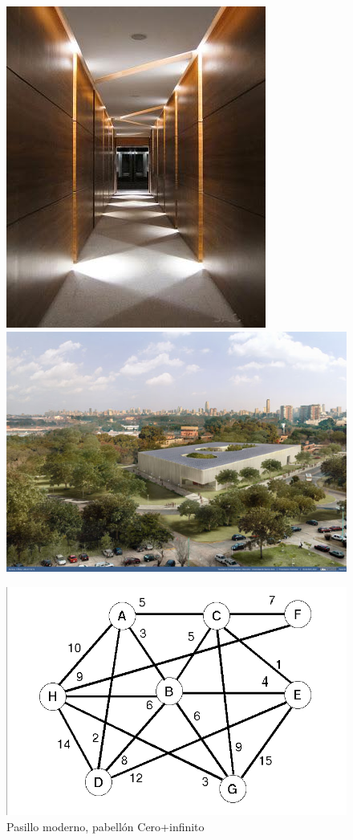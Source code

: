 \begin{figure}[H]
  \begin{center}
      \includegraphics[scale=0.40]{imagenes/pasillo1.jpeg}
      \includegraphics[scale=0.40]{imagenes/cero+infinito1.jpg}
      \caption{Pasillo moderno, pabellón Cero+infinito}
  \end{center}
  \begin{center}    
      \includegraphics[scale=0.30]{imagenes/grafoPasillo.jpg}

\end{center}
\end{figure}
